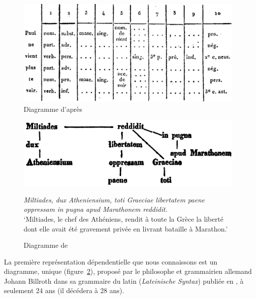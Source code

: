 {    \begin{figure}[H]
    \caption{\label{fig:Gaultier1829}Diagramme d'après \citet{gaultier1817atlas}}
    \includegraphics[width=\textwidth]{figures/Gaultier-conll.png}
    \end{figure}
    
    \begin{figure}[H]
    \caption{\label{fig:Billroth1832}Diagramme de \citet[102]{Billroth1832}\label{fig:Billroth1832}}
    \includegraphics[width=.75\textwidth]{figures/Billroth1832.png}\smallskip\\    
    \noindent\parbox{.75\textwidth}{\small\textit{Miltiades, dux Atheniensium, toti Graeciae libertatem paene oppressam in pugna apud Marathonem reddidit.}\\
    ‘Miltiades, le chef des Athéniens, rendit à toute la Grèce la liberté dont elle avait été gravement privée en livrant bataille à Marathon.’}
    \end{figure}
 
    La première représentation dépendentielle que nous connaissons est un diagramme, unique (figure~\ref{fig:Billroth1832}), proposé par le philosophe et grammairien allemand Johann Billroth dans sa grammaire du latin (\textit{Lateinische Syntax}) publiée en \citeyear{Billroth1832}, à seulement 24 ans (il décédera à 28 ans).
    
}
